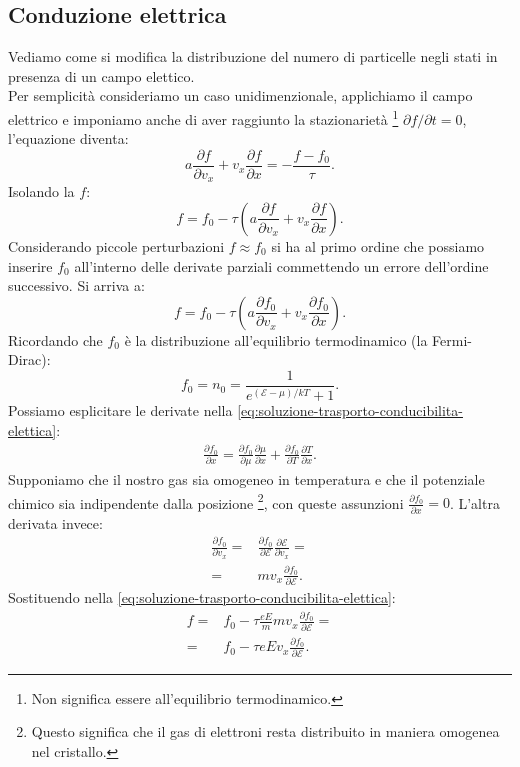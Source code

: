 \subsection{Conduzione elettrica}
\label{subsubsec:Conduzione elettrica}
Vediamo come si modifica la distribuzione del numero di particelle negli stati in presenza di un campo elettico.\\
Per semplicità consideriamo un caso unidimenzionale, applichiamo il campo elettrico e imponiamo anche di aver raggiunto la stazionarietà \footnote{Non significa essere all'equilibrio termodinamico.} $\partial f / \partial t = 0$, l'equazione diventa:
\[
	a \frac{\partial f}{\partial v_x} 
	+ v_x \frac{\partial f}{\partial x} 
	=
	- \frac{f-f_0}{\tau}
.\] 
Isolando la $f$:
\[
	f 
	=
	f_0 - \tau 
	\left( 
	a \frac{\partial f}{\partial v_x} 
	+ 
	v_x \frac{\partial f}{\partial x}  \right) 
.\]
Considerando piccole perturbazioni $f \approx f_0$ si ha al primo ordine che possiamo inserire $f_0$ all'interno delle derivate parziali commettendo un errore dell'ordine successivo. Si arriva a:
\[
	f 
	=
	f_0 
	- 
	\tau 
	\left( 
	a \frac{\partial f_0}{\partial v_x} 
	+ 
	v_x \frac{\partial f_0}{\partial x}  
	\right) \label{eq:soluzione-trasporto-conducibilita-elettica}
.\] 
Ricordando che $f_0$ è la distribuzione all'equilibrio termodinamico (la Fermi-Dirac):
\[
	f_0
	=
	n_0
	=
	\frac{1}{e^{\left( \mathcal{E} - \mu  \right) /kT}+1}
.\] 
Possiamo esplicitare le derivate nella \ref{eq:soluzione-trasporto-conducibilita-elettica}:
\[\begin{aligned}
	\frac{\partial f_0}{\partial x} 
	=
	\frac{\partial f_0}{\partial \mu } \frac{\partial \mu }{\partial x} 
	+
	\frac{\partial f_0}{\partial T} \frac{\partial T}{\partial x} 
	\label{eq:temperatura-non-omo}
.\end{aligned}\]
Supponiamo che il nostro gas sia omogeneo in temperatura e che il potenziale chimico sia indipendente dalla posizione \footnote{Questo significa che il gas di elettroni resta distribuito in maniera omogenea nel cristallo.}, con queste assunzioni $\frac{\partial f_0}{\partial x} = 0$. 
L'altra derivata invece:
\[\begin{aligned}
	\frac{\partial f_0}{\partial v_x} 
	=&
	\frac{\partial f_0}{\partial \mathcal{E} } 
	\frac{\partial \mathcal{E} }{\partial v_x} 
	= \\
	=& mv_x 
	\frac{\partial f_0}{\partial \mathcal{E} } 
.\end{aligned}\]
Sostituendo nella \ref{eq:soluzione-trasporto-conducibilita-elettica}:
\[\begin{aligned}
	f
	=&
	f_0
	-
	\tau \frac{eE}{m}
	mv_x \frac{\partial f_0}{\partial \mathcal{E} }
	=\\
	=& f_0
	-
	\tau e E v_x
	\frac{\partial f_0}{\partial \mathcal{E} } 
.\end{aligned}\]
